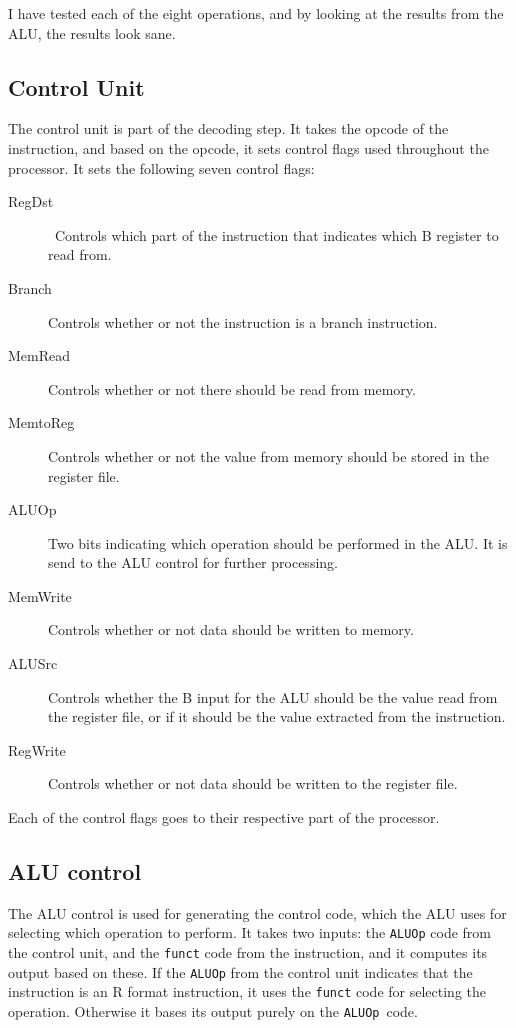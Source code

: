 I have tested each of the eight operations, and by looking at the results from
the ALU, the results look sane.

\subsection{Control Unit}
The control unit is part of the decoding step. It takes the opcode of the
instruction, and based on the opcode, it sets control flags used throughout the
processor. It sets the following seven control flags:
\begin{description}
    \item[RegDst] Controls which part of the instruction that indicates which
        B register to read from.

    \item[Branch] Controls whether or not the instruction is a branch
        instruction.

    \item[MemRead] Controls whether or not there should be read from memory.

    \item[MemtoReg] Controls whether or not the value from memory should be
        stored in the register file.

    \item[ALUOp] Two bits indicating which operation should be performed in
        the ALU. It is send to the ALU control for further processing.

    \item[MemWrite] Controls whether or not data should be written to memory.

    \item[ALUSrc] Controls whether the B input for the ALU should be the
        value read from the register file, or if it should be the value
        extracted from the instruction.

    \item[RegWrite] Controls whether or not data should be written to the
        register file.
\end{description}
Each of the control flags goes to their respective part of the processor.

\subsection{ALU control}\label{sec:alu-control}
The ALU control is used for generating the control code, which the ALU uses for
selecting which operation to perform. It takes two inputs: the \texttt{ALUOp}
code from the control unit, and the \texttt{funct} code from the instruction,
and it computes its output based on these. If the \texttt{ALUOp} from the
control unit indicates that the instruction is an R format instruction, it uses
the \texttt{funct} code for selecting the operation. Otherwise it bases its
output purely on the \texttt{ALUOp} code.

